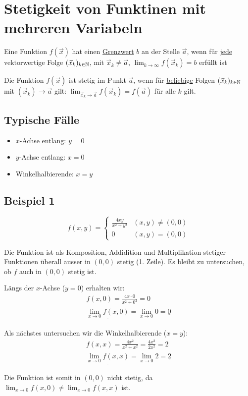 \section{Stetigkeit von Funktinen mit mehreren Variabeln}
\begin{definition}[Grenzwert]
Eine Funktion $f(\vec{x})$ hat einen \underline{Grenzwert} $b$ an der Stelle
$\vec{a}$, wenn für \underline{jede} vektorwertige Folge $(\vec{x}_k)_{k \in \mathbb{N}}$,
mit $\vec{x}_k \neq \vec{a}$, $\lim_{k \to \infty}f(\vec{x}_k) = b$ erfüllt ist
\end{definition}
\begin{definition}[Stetigkeit]
Die Funktion $f(\vec{x})$ ist stetig im Punkt $\vec{a}$, wenn für
\underline{beliebige} Folgen $(\vec{x}_k)_{k \in \mathbb{N}}$ mit
$(\vec{x}_k) \to \vec{a}$ gilt: $\lim_{\vec{x}_k \to \vec{a}} f(\vec{x}_k) = f(\vec{a})$
für alle $k$ gilt.
\end{definition}

\subsection{Typische Fälle}
\begin{itemize}
	\item $x$-Achse entlang: $y = 0$
	\item $y$-Achse entlang: $x = 0$
	\item Winkelhalbierende: $x = y$
\end{itemize}

\subsection{Beispiel 1}
\[
f(x, y) = \begin{cases}
	\frac{4xy}{x^2 + y^2} & (x,y) \neq (0,0)\\
	0 & (x,y) = (0,0)
\end{cases}
\]

Die Funktion ist als Komposition, Addidition und Multiplikation stetiger
Funktionen überall ausser in $(0,0)$ stetig (1. Zeile). Es bleibt zu untersuchen,
ob $f$ auch in $(0,0)$ stetig ist.

Längs der $x$-Achse ($y = 0$) erhalten wir:
\begin{align*}
f(x, 0) = \frac{4x \cdot 0}{x^2 + 0^2} = 0\\
\underline{\lim_{x \to 0} f(x, 0)} = \lim_{x \to 0} 0 = \underline{0}
\end{align*}

Als nächstes untersuchen wir die Winkelhalbierende ($x = y$):
\begin{align*}
f(x, x) = \frac{4x^2}{x^2 + x^2} = \frac{4x^2}{2x^2} = 2\\
\underline{\lim_{x \to 0} f(x, x)} = \lim_{x \to 0} 2 = \underline{2}
\end{align*}

Die Funktion ist somit in $(0,0)$ nicht stetig, da
$\lim_{x \to 0} f(x, 0) \neq \lim_{x \to 0} f(x, x)$ ist.